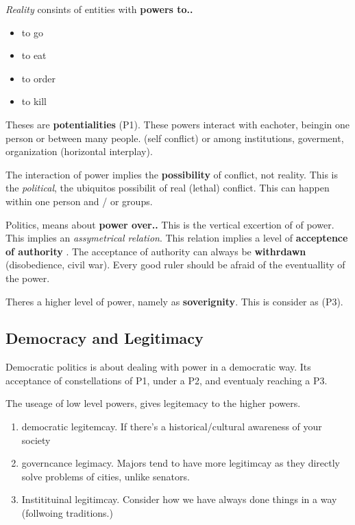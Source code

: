 \textit{Reality} consints of entities with \textbf{powers to..}
\begin{itemize}
	\item to go
	\item to eat
	\item to order
	\item to kill
\end{itemize}

Theses are \textbf{potentialities} (P1). These powers interact with eachoter, beingin one person or between many people. (self conflict) or among institutions, goverment, organization (horizontal interplay).

The interaction of power implies the \textbf{possibility} of conflict, not reality. This is the \textit{political}, the ubiquitos possibilit of real (lethal) conflict. This can happen within one person and / or groups.


Politics, means about \textbf{power over..} This is the vertical excertion of  of power. This implies an \textit{assymetrical relation}.
This relation implies a level of \textbf{acceptence of authority} .
The acceptance of authority can always be \textbf{withrdawn} (disobedience, civil war). Every good ruler should be afraid of the eventuallity of the power.

Theres a higher level of power, namely as \textbf{soverignity}. This is consider as (P3).

\subsection{Democracy and Legitimacy} 

Democratic politics is about dealing with power in a democratic way. Its acceptance of constellations of P1, under a P2, and eventualy reaching a P3.

The useage of low level powers, gives legitemacy to the higher powers.

\begin{enumerate}
	\item democratic legitemcay. If there's a historical/cultural awareness of your society
	\item governcance legimacy. Majors tend to have more legitimcay as they directly solve problems of cities, unlike senators.
	\item Institituinal legitimcay. Consider how we have always done things in a way (follwoing traditions.)
\end{enumerate}


